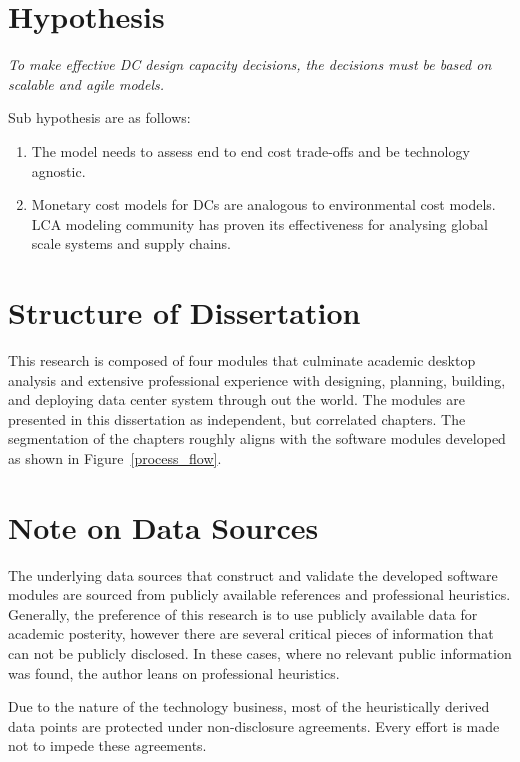 \section{Hypothesis}

    \emph{\large To make effective DC design capacity decisions, the decisions must be based on scalable and agile models.}
        
    Sub hypothesis are as follows:
    
    \begin{enumerate}
        \item The model needs to assess end to end cost trade-offs and be technology agnostic.
    
        \item Monetary cost models for DCs are analogous to environmental cost models. LCA modeling community has proven its effectiveness for analysing global scale systems and supply chains.
    \end{enumerate}
    
\section{Structure of Dissertation}

    This research is composed of four modules that culminate academic desktop analysis and extensive professional experience with designing, planning, building, and deploying data center system through out the world. The modules are presented in this dissertation as independent, but correlated chapters. The segmentation of the chapters roughly aligns with the software modules developed as shown in Figure~\ref{process_flow}.
    
    
    
\section{Note on Data Sources}
    The underlying data sources that construct and validate the developed software modules are sourced from publicly available references and professional heuristics. Generally, the preference of this research is to use publicly available data for academic posterity, however there are several critical pieces of information that can not be publicly disclosed. In these cases, where no relevant public information was found, the author leans on professional heuristics. 
    
    Due to the nature of the technology business, most of the heuristically derived data points are protected under non-disclosure agreements. Every effort is made not to impede these agreements.

